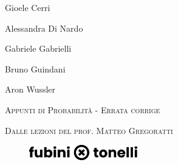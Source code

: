 

\thispagestyle{errata_first}

\hspace{1cm}
{\Large Gioele Cerri \par}
\vspace{-0.2cm}
\hspace{1cm}
{\Large Alessandra Di Nardo \par}
	\vspace{-0.2cm}
\hspace{1cm}
{\Large Gabriele Gabrielli \par}
	\vspace{-0.2cm}
\hspace{1cm}
{\Large Bruno Guindani \par}
	\vspace{-0.2cm}
\hspace{1cm}
{\Large Aron Wussler \par}



\vspace{0.4cm}
\hspace{1cm}
{\scshape\huge Appunti di Probabilità - Errata corrige\par}

\hspace{1cm}
{\scshape\Large Dalle lezioni del prof. Matteo Gregoratti \par}

\begin{figure}[H]
	\centering
	\includegraphics[width=0.42\textwidth]{img/Logo_s.png}
\end{figure}

\clearpage
\pagestyle{errata}